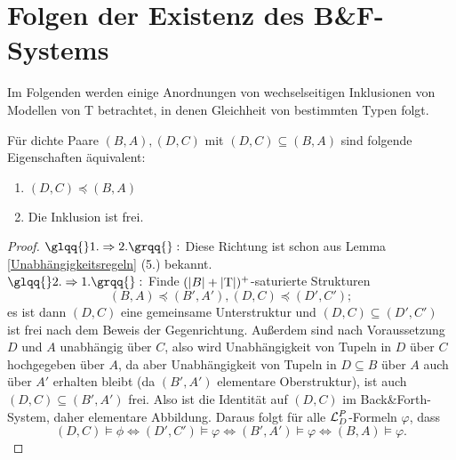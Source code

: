 \section{Folgen der Existenz des B\&F-Systems}
Im Folgenden werden einige Anordnungen von wechselseitigen Inklusionen von Modellen von T betrachtet, in denen Gleichheit von bestimmten Typen folgt.

\begin{lemma}\label{freie Inklusionen}
	Für dichte Paare $(B,A),(D,C)$ mit $(D,C)\subseteq(B,A)$ sind folgende Eigenschaften äquivalent:
	\begin{enumerate}
		\item $(D,C)\preceq(B,A)$
		\item Die Inklusion ist frei.
	\end{enumerate}
\end{lemma}
\begin{proof}
	$\glqq{}1.\Rightarrow2.\grqq{}:$ Diese Richtung ist schon aus Lemma \ref{Unabhängigkeitsregeln} (5.) bekannt.\\
	$\glqq{}2.\Rightarrow1.\grqq{}:$ Finde $({\left| B \right|}+{\left| \operatorname{T} \right|})^+$-saturierte Strukturen $$(B,A)\preceq(B',A'),(D,C)\preceq(D',C');$$ es ist dann $(D,C)$ eine gemeinsame Unterstruktur und $(D,C)\subseteq(D',C')$ ist frei nach dem Beweis der Gegenrichtung. Außerdem sind nach Voraussetzung $D$ und $A$ unabhängig über $C$, also wird Unabhängigkeit von Tupeln in $D$ über $C$ \glqq{}hochgegeben\grqq{} über $A$, da aber Unabhängigkeit von Tupeln in $D\subseteq B$ über $A$ auch über $A'$ erhalten bleibt (da $(B',A')$ elementare Oberstruktur), ist auch $(D,C)\subseteq(B',A')$ frei. Also ist die Identität auf $(D,C)$ im Back\&Forth-System, daher elementare Abbildung. Daraus folgt für alle $\mathcal{L}^P_D$-Formeln $\varphi$, dass $$(D,C)\models\phi\Leftrightarrow(D',C')\models\varphi\Leftrightarrow(B',A')\models\varphi\Leftrightarrow(B,A)\models\varphi.$$
\end{proof}

